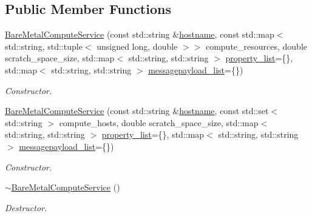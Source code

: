 \subsection*{Public Member Functions}
\begin{DoxyCompactItemize}
\item 
\hyperlink{classwrench_1_1_bare_metal_compute_service_ad1f0b74b15538742ec16da2f805df662}{Bare\+Metal\+Compute\+Service} (const std\+::string \&\hyperlink{classwrench_1_1_s4_u___daemon_a52bc0b9a6cd248310749dac086819f00}{hostname}, const std\+::map$<$ std\+::string, std\+::tuple$<$ unsigned long, double $>$$>$ compute\+\_\+resources, double scratch\+\_\+space\+\_\+size, std\+::map$<$ std\+::string, std\+::string $>$ \hyperlink{classwrench_1_1_service_a032143b1e2d7296dde9b4ca1e34845ce}{property\+\_\+list}=\{\}, std\+::map$<$ std\+::string, std\+::string $>$ \hyperlink{classwrench_1_1_service_a63865f20c92027ab626ab1347b0099d2}{messagepayload\+\_\+list}=\{\})
\begin{DoxyCompactList}\small\item\em Constructor. \end{DoxyCompactList}\item 
\hyperlink{classwrench_1_1_bare_metal_compute_service_a67f03e4100d64ad6921dd65bfd1c8293}{Bare\+Metal\+Compute\+Service} (const std\+::string \&\hyperlink{classwrench_1_1_s4_u___daemon_a52bc0b9a6cd248310749dac086819f00}{hostname}, const std\+::set$<$ std\+::string $>$ compute\+\_\+hosts, double scratch\+\_\+space\+\_\+size, std\+::map$<$ std\+::string, std\+::string $>$ \hyperlink{classwrench_1_1_service_a032143b1e2d7296dde9b4ca1e34845ce}{property\+\_\+list}=\{\}, std\+::map$<$ std\+::string, std\+::string $>$ \hyperlink{classwrench_1_1_service_a63865f20c92027ab626ab1347b0099d2}{messagepayload\+\_\+list}=\{\})
\begin{DoxyCompactList}\small\item\em Constructor. \end{DoxyCompactList}\item 
\mbox{\label{classwrench_1_1_bare_metal_compute_service_a2f5c37d9c535f10a7495896082f4381e}} 
\hyperlink{classwrench_1_1_bare_metal_compute_service_a2f5c37d9c535f10a7495896082f4381e}{$\sim$\+Bare\+Metal\+Compute\+Service} ()
\begin{DoxyCompactList}\small\item\em Destructor. \end{DoxyCompactList}\item 
$$
\end{DoxyCompactItemize}
